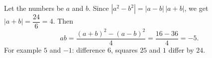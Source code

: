Let the numbers be $a$ and $b$. Since $|a^2-b^2|=|a-b|\,|a+b|$, we get $|a+b|=\dfrac{24}{6}=4$. Then
\[
ab=\dfrac{(a+b)^2-(a-b)^2}{4}=\dfrac{16-36}{4}=\boxed{-5}.
\]
For example $5$ and $-1$: difference $6$, squares $25$ and $1$ differ by $24$.
